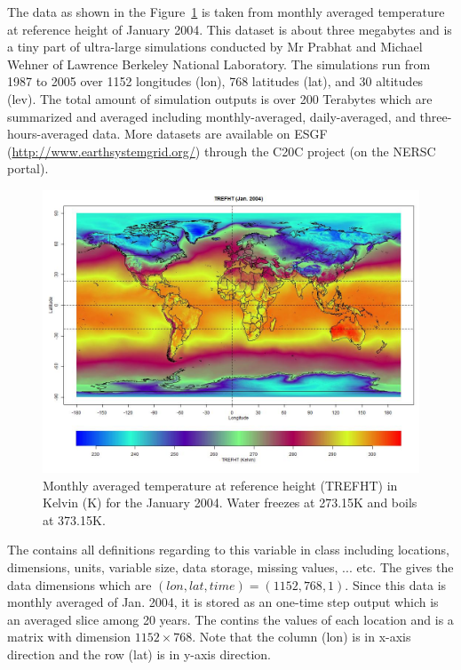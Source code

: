 The data  as shown in the Figure~\ref{fig:trefht}
is taken from monthly averaged temperature at
reference height of January 2004.
This dataset is about three megabytes and is a tiny part of
ultra-large simulations conducted by Mr Prabhat and Michael Wehner
of Lawrence Berkeley National Laboratory.
The simulations run from 1987 to 2005 over
1152 longitudes (lon), 768 latitudes (lat), and 30 altitudes (lev).
The total amount of simulation outputs is over 200 Terabytes
which are summarized and averaged including monthly-averaged,
daily-averaged, and three-hours-averaged data.
More datasets are available on ESGF (\url{http://www.earthsystemgrid.org/})
through the C20C project (on the NERSC portal).
\begin{figure}[t]
  \centering
  \includegraphics[width=6.0in]{pbdDEMO-include/pics/trefht.jpg}
  \caption[Monthly averaged temperature]{Monthly averaged temperature at reference height (TREFHT) in
           Kelvin (K) for the January 2004. Water freezes at 273.15K and
           boils at 373.15K.}
  \label{fig:trefht}
\end{figure}

The  contains all definitions regarding to this variable in
class  including locations, dimensions, units, variable size,
data storage, missing values, ... etc.
The  gives the data dimensions which are
$(lon, lat, time) = (1152, 768, 1)$. Since this data is monthly averaged
of Jan. 2004, it is stored as an one-time step output which is
an averaged slice among 20 years.
The  contins the values of each
location and is a matrix with dimension
$1152\times 768$. Note that the column (lon) is in x-axis direction
and the row (lat) is in y-axis direction.


